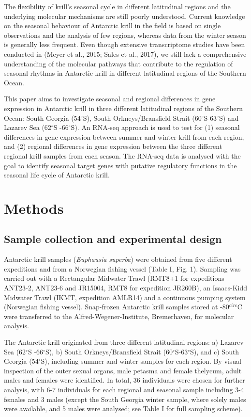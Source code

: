 The flexibility of krill's seasonal cycle in different latitudinal regions and
the underlying molecular mechanisms are still poorly understood. Current
knowledge on the seasonal behaviour of Antarctic krill in the field is based on
single observations and the analysis of few regions, whereas data from the
winter season is generally less frequent. Even though extensive transcriptome
studies have been conducted in  (Meyer et al., 2015; Sales et
al., 2017), we still lack a comprehensive understanding of the molecular
pathways that contribute to the regulation of seasonal rhythms in Antarctic
krill in different latitudinal regions of the Southern Ocean. 

This paper aims to investigate seasonal and regional differences in gene
expression in Antarctic krill in three different latitudinal regions of the
Southern Ocean: South Georgia (54$^{\circ}$S), South Orkneys/Bransfield Strait
(60$^{\circ}$S-63$^{\circ}$S) and Lazarev Sea (62$^{\circ}$S -66$^{\circ}$S). An
RNA-seq approach is used to test for (1) seasonal differences in gene
expression between summer and winter krill from each region, and (2) regional
differences in gene expression between the three different regional krill
samples from each season. The RNA-seq data is analysed with the goal to
identify seasonal target genes with putative regulatory functions in the
seasonal life cycle of Antarctic krill.

\section{Methods}

\subsection*{Sample collection and experimental design}

Antarctic krill samples (\textit{Euphausia superba}) were obtained from five
different expeditions and from a Norwegian fishing vessel (Table I, Fig. 1).
Sampling was carried out with a Rectangular Midwater Trawl (RMT8+1 for
expeditions ANT23-2, ANT23-6 and JR15004, RMT8 for expedition JR260B), an
Isaacs-Kidd Midwater Trawl (IKMT, expedition AMLR14) and a continuous pumping
system (Norwegian fishing vessel). Snap-frozen Antarctic krill samples stored
at -80$^{circ}$C were transferred to the Alfred-Wegener-Institute, Bremerhaven,
for molecular analysis.

The Antarctic krill originated from three different latitudinal regions:
a) Lazarev Sea (62$^{\circ}$S -66$^{\circ}$S), b) South
Orkneys/Bransfield Strait (60$^{\circ}$S-63$^{\circ}$S), and c) South
Georgia (54$^{\circ}$S), including summer and winter samples for each region.
By visual inspection of the outer sexual organs, male petasma and female
thelycum, adult males and females were identified. In total, 36 individuals
were chosen for further analysis, with 6-7 individuals for each regional and
seasonal sample including 3-4 females and 3 males (except the South Georgia
winter sample, where solely males were available, and 5 males were analysed;
see Table I for full sampling scheme).

